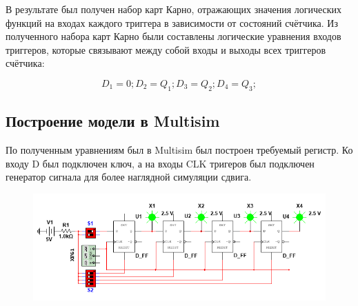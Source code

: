 В результате был получен набор карт Карно, отражающих значения логических функций
на входах каждого триггера в зависимости от состояний счётчика.
Из полученного набора карт Карно были составлены логические уравнения входов
триггеров, которые связывают между собой входы и выходы всех триггеров счётчика:

$$
    D_1=0; D_2=Q_1; D_3=Q_2; D_4=Q_3;
$$

\newpage

\subsection*{Построение модели в Multisim}

По полученным уравнениям был в Multisim был построен требуемый регистр.
Ко входу D был подключен ключ, а на входы CLK тригеров был подключен генератор
сигнала для более наглядной симуляции сдвига.

\begin{figure}[h!]
    \centering
    \includegraphics[scale=0.9]{images/image-1.png}
\end{figure}



